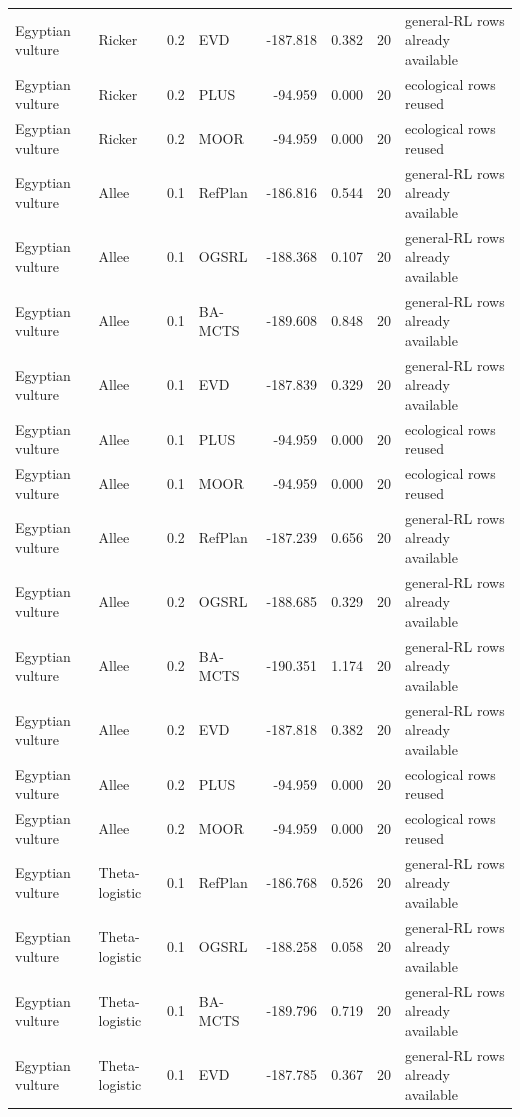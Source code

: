 \documentclass[10pt]{article}
\begin{document}
\begin{landscape}
\begin{center}
\begin{longtable}{@{}llclr rrp{5.2cm}@{}}
Egyptian vulture & Ricker & 0.2 & EVD & -187.818 & 0.382 & 20 & general-RL rows already available \\
Egyptian vulture & Ricker & 0.2 & PLUS & -94.959 & 0.000 & 20 & ecological rows reused \\
Egyptian vulture & Ricker & 0.2 & MOOR & -94.959 & 0.000 & 20 & ecological rows reused \\
\addlinespace[1.5pt]
Egyptian vulture & Allee & 0.1 & RefPlan & -186.816 & 0.544 & 20 & general-RL rows already available \\
Egyptian vulture & Allee & 0.1 & OGSRL & -188.368 & 0.107 & 20 & general-RL rows already available \\
Egyptian vulture & Allee & 0.1 & BA-MCTS & -189.608 & 0.848 & 20 & general-RL rows already available \\
Egyptian vulture & Allee & 0.1 & EVD & -187.839 & 0.329 & 20 & general-RL rows already available \\
Egyptian vulture & Allee & 0.1 & PLUS & -94.959 & 0.000 & 20 & ecological rows reused \\
Egyptian vulture & Allee & 0.1 & MOOR & -94.959 & 0.000 & 20 & ecological rows reused \\
\addlinespace[1.5pt]
Egyptian vulture & Allee & 0.2 & RefPlan & -187.239 & 0.656 & 20 & general-RL rows already available \\
Egyptian vulture & Allee & 0.2 & OGSRL & -188.685 & 0.329 & 20 & general-RL rows already available \\
Egyptian vulture & Allee & 0.2 & BA-MCTS & -190.351 & 1.174 & 20 & general-RL rows already available \\
Egyptian vulture & Allee & 0.2 & EVD & -187.818 & 0.382 & 20 & general-RL rows already available \\
Egyptian vulture & Allee & 0.2 & PLUS & -94.959 & 0.000 & 20 & ecological rows reused \\
Egyptian vulture & Allee & 0.2 & MOOR & -94.959 & 0.000 & 20 & ecological rows reused \\
\addlinespace[1.5pt]
Egyptian vulture & Theta-logistic & 0.1 & RefPlan & -186.768 & 0.526 & 20 & general-RL rows already available \\
Egyptian vulture & Theta-logistic & 0.1 & OGSRL & -188.258 & 0.058 & 20 & general-RL rows already available \\
Egyptian vulture & Theta-logistic & 0.1 & BA-MCTS & -189.796 & 0.719 & 20 & general-RL rows already available \\
Egyptian vulture & Theta-logistic & 0.1 & EVD & -187.785 & 0.367 & 20 & general-RL rows already available \\

\end{longtable}
\end{center}
\end{landscape}
\end{document}
